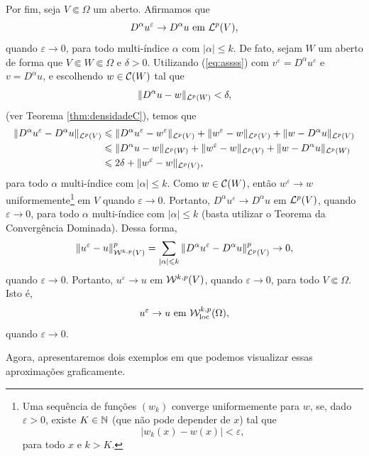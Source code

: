 \begin{prf}
    Por fim, seja $V \Subset \Omega$ um aberto. Afirmamos que
    \begin{equation}
        D ^\alpha u^\varepsilon \to D^\alpha u \text{ em } \mathcal{L}^p(V),
    \end{equation}
    quando $\varepsilon \to 0$, para todo multi-índice $\alpha$ com $|\alpha| \leqslant k$.
    De fato, sejam $W$ um aberto de forma que $V \Subset W \Subset \Omega$ e $\delta > 0$. Utilizando (\ref{eq:assss}) com $v ^\varepsilon = D^\alpha u^\varepsilon$ e $v = D^\alpha u$, e escolhendo $w \in \mathcal{C}(W)$ tal que
    \[
        \Vert D^\alpha u - w \Vert_{\mathcal{L}^p(W)} < \delta,
    \]
    (ver Teorema \ref{thm:densidadeC}), temos que
    \[
        \begin{aligned}
            \Vert D^\alpha u^\varepsilon - D^\alpha u \Vert_{\mathcal{L}^p(V)} 
            &\leqslant \Vert D^\alpha u^\varepsilon - w^\varepsilon \Vert_{\mathcal{L}^p(V)} + \Vert w^\varepsilon - w \Vert_{\mathcal{L}^p(V)} + \Vert w - D^\alpha u \Vert_{\mathcal{L}^p(V)}\\
            &\leqslant \Vert D^\alpha u - w \Vert_{\mathcal{L}^p(W)} + \Vert w^\varepsilon - w \Vert_{\mathcal{L}^p(V)} + \Vert w - D^\alpha u \Vert_{\mathcal{L}^p(W)}\\ 
            &\leqslant 2\delta + \Vert w^\varepsilon - w \Vert_{\mathcal{L}^p(V)},
        \end{aligned}
    \]
    para todo $\alpha$ multi-índice com $|\alpha| \leqslant k$.
    Como $w \in \mathcal{C}(W)$, então $w^\varepsilon \to w$ uniformemente\footnote{Uma sequência de funções $(w_k)$ converge uniformemente para $w$, se, dado $\varepsilon > 0$, existe $K \in \mathbb{N}$ (que não pode depender de $x$) tal que
    \[
        | w_k(x) - w(x) | < \varepsilon,
    \]
    para todo $x$ e $k > K$.
    } em $V$ quando $\varepsilon \to 0$. 
    Portanto, $D^\alpha u^\varepsilon \to D^\alpha u$ em $\mathcal{L}^p(V)$, quando $\varepsilon \to 0$, para todo $\alpha$ multi-índice com $|\alpha| \leqslant k$ (basta utilizar o Teorema da Convergência Dominada).
    Dessa forma,
    \[
        \Vert u^\varepsilon - u \Vert^p_{\mathcal{W}^{k,p}(V)} = \sum_{|\alpha| \leqslant k} \Vert D^\alpha u^\varepsilon - D^\alpha u \Vert^p_{\mathcal{L}^p(V)} \to 0,
    \]
    quando $\varepsilon \to 0$. Portanto, $u^\varepsilon \to u$ em $\mathcal{W}^{k,p}(V)$, quando $\varepsilon \to 0$, para todo $V \Subset \Omega$. Isto é,
    \[
        u^\varepsilon \to u \text{ em } \mathcal{W}^{k,p}_{\mathrm{loc}}(\Omega),
    \]
    quando $\varepsilon \to 0$.
\end{prf}

Agora, apresentaremos dois exemplos em que podemos visualizar essas aproximações graficamente.

